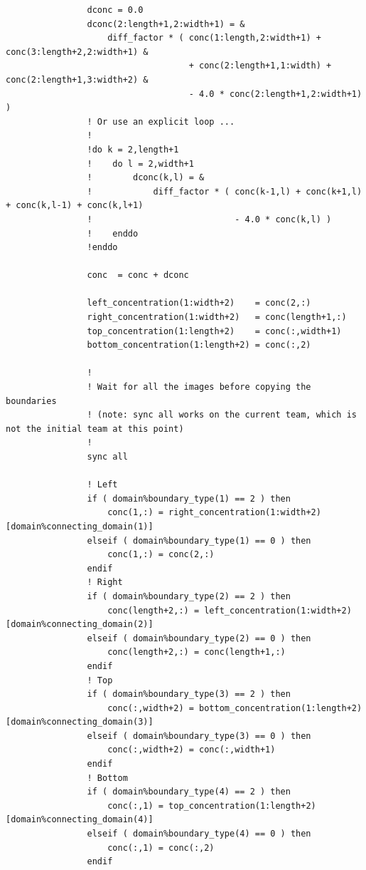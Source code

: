 \documentclass[onecolumn]{article}
\begin{document}
\begin{small}
\begin{verbatim}
                dconc = 0.0
                dconc(2:length+1,2:width+1) = &
                    diff_factor * ( conc(1:length,2:width+1) + conc(3:length+2,2:width+1) &
                                    + conc(2:length+1,1:width) + conc(2:length+1,3:width+2) &
                                    - 4.0 * conc(2:length+1,2:width+1) )
                ! Or use an explicit loop ...
                !
                !do k = 2,length+1
                !    do l = 2,width+1
                !        dconc(k,l) = &
                !            diff_factor * ( conc(k-1,l) + conc(k+1,l) + conc(k,l-1) + conc(k,l+1)
                !                            - 4.0 * conc(k,l) )
                !    enddo
                !enddo

                conc  = conc + dconc

                left_concentration(1:width+2)    = conc(2,:)
                right_concentration(1:width+2)   = conc(length+1,:)
                top_concentration(1:length+2)    = conc(:,width+1)
                bottom_concentration(1:length+2) = conc(:,2)

                !
                ! Wait for all the images before copying the boundaries
                ! (note: sync all works on the current team, which is not the initial team at this point)
                !
                sync all

                ! Left
                if ( domain%boundary_type(1) == 2 ) then
                    conc(1,:) = right_concentration(1:width+2)[domain%connecting_domain(1)]
                elseif ( domain%boundary_type(1) == 0 ) then
                    conc(1,:) = conc(2,:)
                endif
                ! Right
                if ( domain%boundary_type(2) == 2 ) then
                    conc(length+2,:) = left_concentration(1:width+2)[domain%connecting_domain(2)]
                elseif ( domain%boundary_type(2) == 0 ) then
                    conc(length+2,:) = conc(length+1,:)
                endif
                ! Top
                if ( domain%boundary_type(3) == 2 ) then
                    conc(:,width+2) = bottom_concentration(1:length+2)[domain%connecting_domain(3)]
                elseif ( domain%boundary_type(3) == 0 ) then
                    conc(:,width+2) = conc(:,width+1)
                endif
                ! Bottom
                if ( domain%boundary_type(4) == 2 ) then
                    conc(:,1) = top_concentration(1:length+2)[domain%connecting_domain(4)]
                elseif ( domain%boundary_type(4) == 0 ) then
                    conc(:,1) = conc(:,2)
                endif


\end{verbatim}
\end{small}
\end{document}
